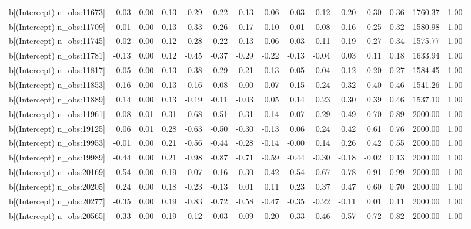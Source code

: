 \begin{table}[ht]
\begin{tabular}{rrrrrrrrrrrrrrr}
  b[(Intercept) n\_obs:11673] & 0.03 & 0.00 & 0.13 & -0.29 & -0.22 & -0.13 & -0.06 & 0.03 & 0.12 & 0.20 & 0.30 & 0.36 & 1760.37 & 1.00 \\ 
  b[(Intercept) n\_obs:11709] & -0.01 & 0.00 & 0.13 & -0.33 & -0.26 & -0.17 & -0.10 & -0.01 & 0.08 & 0.16 & 0.25 & 0.32 & 1580.98 & 1.00 \\ 
  b[(Intercept) n\_obs:11745] & 0.02 & 0.00 & 0.12 & -0.28 & -0.22 & -0.13 & -0.06 & 0.03 & 0.11 & 0.19 & 0.27 & 0.34 & 1575.77 & 1.00 \\ 
  b[(Intercept) n\_obs:11781] & -0.13 & 0.00 & 0.12 & -0.45 & -0.37 & -0.29 & -0.22 & -0.13 & -0.04 & 0.03 & 0.11 & 0.18 & 1633.94 & 1.00 \\ 
  b[(Intercept) n\_obs:11817] & -0.05 & 0.00 & 0.13 & -0.38 & -0.29 & -0.21 & -0.13 & -0.05 & 0.04 & 0.12 & 0.20 & 0.27 & 1584.45 & 1.00 \\ 
  b[(Intercept) n\_obs:11853] & 0.16 & 0.00 & 0.13 & -0.16 & -0.08 & -0.00 & 0.07 & 0.15 & 0.24 & 0.32 & 0.40 & 0.46 & 1541.26 & 1.00 \\ 
  b[(Intercept) n\_obs:11889] & 0.14 & 0.00 & 0.13 & -0.19 & -0.11 & -0.03 & 0.05 & 0.14 & 0.23 & 0.30 & 0.39 & 0.46 & 1537.10 & 1.00 \\ 
  b[(Intercept) n\_obs:11961] & 0.08 & 0.01 & 0.31 & -0.68 & -0.51 & -0.31 & -0.14 & 0.07 & 0.29 & 0.49 & 0.70 & 0.89 & 2000.00 & 1.00 \\ 
  b[(Intercept) n\_obs:19125] & 0.06 & 0.01 & 0.28 & -0.63 & -0.50 & -0.30 & -0.13 & 0.06 & 0.24 & 0.42 & 0.61 & 0.76 & 2000.00 & 1.00 \\ 
  b[(Intercept) n\_obs:19953] & -0.01 & 0.00 & 0.21 & -0.56 & -0.44 & -0.28 & -0.14 & -0.00 & 0.14 & 0.26 & 0.42 & 0.55 & 2000.00 & 1.00 \\ 
  b[(Intercept) n\_obs:19989] & -0.44 & 0.00 & 0.21 & -0.98 & -0.87 & -0.71 & -0.59 & -0.44 & -0.30 & -0.18 & -0.02 & 0.13 & 2000.00 & 1.00 \\ 
  b[(Intercept) n\_obs:20169] & 0.54 & 0.00 & 0.19 & 0.07 & 0.16 & 0.30 & 0.42 & 0.54 & 0.67 & 0.78 & 0.91 & 0.99 & 2000.00 & 1.00 \\ 
  b[(Intercept) n\_obs:20205] & 0.24 & 0.00 & 0.18 & -0.23 & -0.13 & 0.01 & 0.11 & 0.23 & 0.37 & 0.47 & 0.60 & 0.70 & 2000.00 & 1.00 \\ 
  b[(Intercept) n\_obs:20277] & -0.35 & 0.00 & 0.19 & -0.83 & -0.72 & -0.58 & -0.47 & -0.35 & -0.22 & -0.11 & 0.01 & 0.11 & 2000.00 & 1.00 \\ 
  b[(Intercept) n\_obs:20565] & 0.33 & 0.00 & 0.19 & -0.12 & -0.03 & 0.09 & 0.20 & 0.33 & 0.46 & 0.57 & 0.72 & 0.82 & 2000.00 & 1.00 \\ 

\end{tabular}
\end{table}
